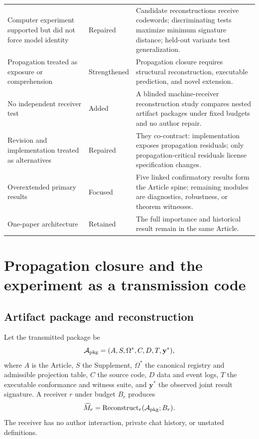 \documentclass[11pt]{article}
\newcommand{\InvReg}{\Omega^{\ast}}
\newcommand{\Mhat}{\widehat M}
\newcommand{\Pkg}{\mathcal A_{\rm pkg}}
\newcommand{\Codeword}{\mathbf y}
\begin{document}
\begin{longtable}{p{}p{}p{}}
Computer experiment supported but did not force model identity & Repaired & Candidate reconstructions receive codewords; discriminating tests maximize minimum signature distance; held-out variants test generalization.\\
Propagation treated as exposure or comprehension & Strengthened & Propagation closure requires structural reconstruction, executable prediction, and novel extension.\\
No independent receiver test & Added & A blinded machine-receiver reconstruction study compares nested artifact packages under fixed budgets and no author repair.\\
Revision and implementation treated as alternatives & Repaired & They co-contract: implementation exposes propagation residuals; only propagation-critical residuals license specification changes.\\
Overextended primary results & Focused & Five linked confirmatory results form the Article spine; remaining modules are diagnostics, robustness, or theorem witnesses.\\
One-paper architecture & Retained & The full importance and historical result remain in the same Article.\\
\bottomrule
\end{longtable}

\section{Propagation closure and the experiment as a transmission code}

\subsection{Artifact package and reconstruction}

Let the transmitted package be
\begin{equation}
\Pkg=(A,S,\InvReg,C,D,T,\Codeword^{\ast}),
\end{equation}
where $A$ is the Article, $S$ the Supplement, $\InvReg$ the canonical registry and admissible projection table, $C$ the source code, $D$ data and event logs, $T$ the executable conformance and witness suite, and $\Codeword^{\ast}$ the observed joint result signature. A receiver $r$ under budget $B_r$ produces
\begin{equation}
\Mhat_r=\operatorname{Reconstruct}_r(\Pkg;B_r).
\end{equation}
The receiver has no author interaction, private chat history, or unstated definitions.
\end{document}
